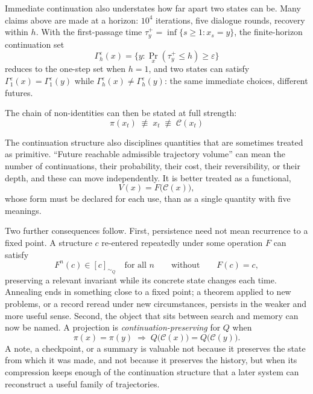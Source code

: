 \documentclass[11pt]{article}
\theoremstyle{definition}
\theoremstyle{remark}
\begin{document}
Immediate continuation also understates how far apart two states can be. Many claims above are made at a horizon: $10^4$ iterations, five dialogue rounds, recovery within $h$. With the first-passage time $\tau^+_y = \inf\{s \geq 1 : x_s = y\}$, the finite-horizon continuation set
\begin{equation}
\Gamma_h^\varepsilon(x) = \{ y : \Pr_x(\tau^+_y \leq h) \geq \varepsilon \}
\end{equation}
reduces to the one-step set when $h = 1$, and two states can satisfy $\Gamma_1^\varepsilon(x) = \Gamma_1^\varepsilon(y)$ while $\Gamma_h^\varepsilon(x) \neq \Gamma_h^\varepsilon(y)$: the same immediate choices, different futures.

The chain of non-identities can then be stated at full strength:
\begin{equation}
\boxed{\, \pi(x_t) \;\not\equiv\; x_t \;\not\equiv\; \mathcal{C}(x_t) \,}
\end{equation}

The continuation structure also disciplines quantities that are sometimes treated as primitive. ``Future reachable admissible trajectory volume'' \cite{flyxion-clipboard} can mean the number of continuations, their probability, their cost, their reversibility, or their depth, and these can move independently. It is better treated as a functional,
\begin{equation}
V(x) = F\big(\mathcal{C}(x)\big),
\end{equation}
whose form must be declared for each use, than as a single quantity with five meanings.

Two further consequences follow. First, persistence need not mean recurrence to a fixed point. A structure $c$ re-entered repeatedly under some operation $F$ can satisfy
\begin{equation}
F^n(c) \in [c]_{\sim_Q} \quad\text{for all } n
\qquad\text{without}\qquad F(c) = c ,
\end{equation}
preserving a relevant invariant while its concrete state changes each time. Annealing ends in something close to a fixed point; a theorem applied to new problems, or a record reread under new circumstances, persists in the weaker and more useful sense. Second, the object that sits between search and memory can now be named. A projection is \emph{continuation-preserving} for $Q$ when
\begin{equation}
\pi(x) = \pi(y) \;\Rightarrow\; Q\big(\mathcal{C}(x)\big) = Q\big(\mathcal{C}(y)\big).
\end{equation}
A note, a checkpoint, or a summary is valuable not because it preserves the state from which it was made, and not because it preserves the history, but when its compression keeps enough of the continuation structure that a later system can reconstruct a useful family of trajectories.
\end{document}

